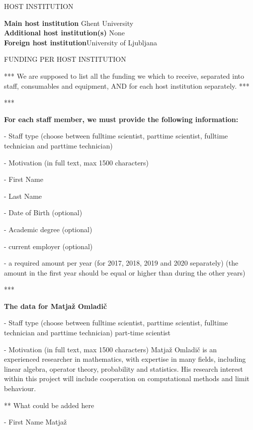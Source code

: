 \documentclass[11pt,dvipsnames,usenames,a4paper]{article}
\begin{document}
\vspace{10pt}

\begin{shaded}\centering HOST INSTITUTION \end{shaded}
\textbf{Main host institution} \tab Ghent University \\
\textbf{Additional host institution(s)} \tab None\\
\textbf{Foreign host institution}\tab University of Ljubljana \\

\begin{shaded}\centering FUNDING PER HOST INSTITUTION \end{shaded}

*** We are supposed to list all the funding we which to receive, separated into staff, consumables and equipment, AND for each host institution separately. ***

*** {\bf\color{blue}For each staff member, we must provide the following information:

- Staff type (choose between fulltime scientist, parttime scientist, fulltime technician and parttime technician)

- Motivation (in full text, max 1500 characters)

- First Name

- Last Name

- Date of Birth (optional)

- Academic degree (optional)

- current employer (optional)

- a required amount per year (for 2017, 2018, 2019 and 2020 separately) (the amount in the first year should be equal or higher than during the other years)

} ***

{\bf\color{blue} The data for Matjaž Omladič}
	
- Staff type (choose between fulltime scientist, parttime scientist, fulltime technician and parttime technician)
part-time scientist

- Motivation (in full text, max 1500 characters)
Matjaž Omladič is an experienced researcher in mathematics, with expertise in many fields, including linear algebra, operator theory, probability and statistics. His research interest within this project will include cooperation on computational methods and limit behaviour. 

** What could be added here 

- First Name
Matjaž
\end{document}
